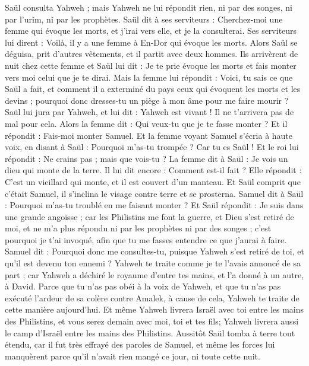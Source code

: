 \begin{multicols}{2}
Saül consulta Yahweh ; mais Yahweh ne lui répondit rien, ni par des songes, ni par l'urim, ni par les prophètes.
Saül dit à ses serviteurs : Cherchez-moi une femme qui évoque les morts, et j'irai vers elle, et je la consulterai. Ses serviteurs lui dirent : Voilà, il y a une femme à En-Dor qui évoque les morts.
Alors Saül se déguisa, prit d'autres vêtements, et il partit avec deux hommes. Ils arrivèrent de nuit chez cette femme et Saül lui dit : Je te prie évoque les morts et fais monter vers moi celui que je te dirai.
Mais la femme lui répondit : Voici, tu sais ce que Saül a fait, et comment il a exterminé du pays ceux qui évoquent les morts et les devins ; pourquoi donc dresses-tu un piège à mon âme pour me faire mourir ?
Saül lui jura par Yahweh, et lui dit : Yahweh est vivant ! Il ne t'arrivera pas de mal pour cela.
Alors la femme dit : Qui veux-tu que je te fasse monter ? Et il répondit : Fais-moi monter Samuel.
Et la femme voyant Samuel s'écria à haute voix, en disant à Saül : Pourquoi m'as-tu trompée ? Car tu es Saül !
Et le roi lui répondit : Ne crains pas ; mais que vois-tu ? La femme dit à Saül : Je vois un dieu qui monte de la terre.
Il lui dit encore : Comment est-il fait ? Elle répondit : C'est un vieillard qui monte, et il est couvert d'un manteau. Et Saül comprit que c'était Samuel, il s'inclina le visage contre terre et se prosterna.
Samuel dit à Saül : Pourquoi m'as-tu troublé en me faisant monter ? Et Saül répondit : Je suis dans une grande angoisse ; car les Philistins me font la guerre, et Dieu s'est retiré de moi, et ne m'a plus répondu ni par les prophètes ni par des songes ; c'est pourquoi je t'ai invoqué, afin que tu me fasses entendre ce que j'aurai à faire.
Samuel dit : Pourquoi donc me consultes-tu, puisque Yahweh s'est retiré de toi, et qu'il est devenu ton ennemi ?
Yahweh te traite comme je te l'avais annoncé de sa part ; car Yahweh a déchiré le royaume d'entre tes mains, et l'a donné à un autre, à David.
Parce que tu n'as pas obéi à la voix de Yahweh, et que tu n'as pas exécuté l'ardeur de sa colère contre Amalek, à cause de cela, Yahweh te traite de cette manière aujourd'hui.
Et même Yahweh livrera Israël avec toi entre les mains des Philistins, et vous serez demain avec moi, toi et tes fils; Yahweh livrera aussi le camp d'Israël entre les mains des Philistins.
Aussitôt Saül tomba à terre tout étendu, car il fut très effrayé des paroles de Samuel, et même les forces lui manquèrent parce qu'il n'avait rien mangé ce jour, ni toute cette nuit.

\end{multicols}
